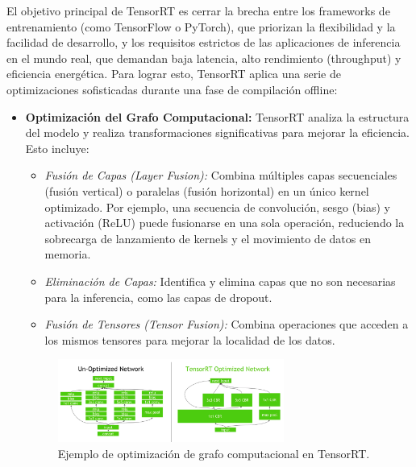 \documentclass[11pt,spanish,listoffigures,listoftables]{tfgetsinf}
\begin{document}
El objetivo principal de TensorRT es cerrar la brecha entre los frameworks de entrenamiento (como TensorFlow o PyTorch), que priorizan la flexibilidad y la facilidad de desarrollo, y los requisitos estrictos de las aplicaciones de inferencia en el mundo real, que demandan baja latencia, alto rendimiento (throughput) y eficiencia energética. Para lograr esto, TensorRT aplica una serie de optimizaciones sofisticadas durante una fase de compilación offline:

\begin{itemize}
   \item \textbf{Optimización del Grafo Computacional:} TensorRT analiza la estructura del modelo y realiza transformaciones significativas para mejorar la eficiencia. Esto incluye:
      \begin{itemize}
         \item \textit{Fusión de Capas (Layer Fusion):} Combina múltiples capas secuenciales (fusión vertical) o paralelas (fusión horizontal) en un único kernel optimizado. Por ejemplo, una secuencia de convolución, sesgo (bias) y activación (ReLU) puede fusionarse en una sola operación, reduciendo la sobrecarga de lanzamiento de kernels y el movimiento de datos en memoria.
         \item \textit{Eliminación de Capas:} Identifica y elimina capas que no son necesarias para la inferencia, como las capas de dropout.
         \item \textit{Fusión de Tensores (Tensor Fusion):} Combina operaciones que acceden a los mismos tensores para mejorar la localidad de los datos.
      \end{itemize}

      \begin{figure}[H]
         \centering
         \includegraphics[width=0.7\textwidth]{images/estado_del_arte/TensorRT_optimizaciones.png}
         \caption[Ejemplo de optimización de grafo computacional en TensorRT]{Ejemplo de optimización de grafo computacional en TensorRT.}
         \label{fig:tensorrt_optimization_graph}
      \end{figure}



\end{itemize}
\end{document}
